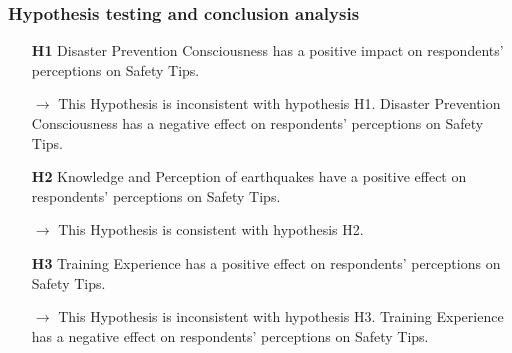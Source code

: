 \begin{table}[h]
  \caption{Discriminant Validity }
  \label{table36}
  \centering
{}
\end{table}

\subsubsection{Hypothesis testing and conclusion analysis}
\begin{itemize}
\item[\textbf{H1}] Disaster Prevention Consciousness has a positive impact on respondents' perceptions on Safety Tips.
\item[\textbf{$\longrightarrow$}] This Hypothesis is inconsistent with hypothesis H1. Disaster Prevention Consciousness has a negative effect on respondents' perceptions on Safety Tips.
\item[\textbf{H2}] Knowledge and Perception of earthquakes have a positive effect on respondents' perceptions on Safety Tips.
\item[\textbf{$\longrightarrow$}] This Hypothesis is consistent with hypothesis H2. 
\item[\textbf{H3}] Training Experience has a positive effect on respondents' perceptions on Safety Tips.
\item[\textbf{$\longrightarrow$}] This Hypothesis is inconsistent with hypothesis H3. Training Experience has a negative effect on respondents' perceptions on Safety Tips.
\end{itemize}

